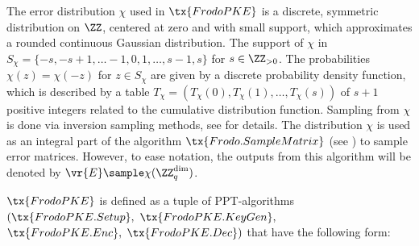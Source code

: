 \documentclass{fundam}
\begin{document}
The error distribution $\chi$ used in $\tx{FrodoPKE}$ is a discrete, symmetric distribution on $\ZZ$, centered at zero and with small support, which approximates a rounded continuous Gaussian distribution. The support of $\chi$ in $S_{\chi}=\{ -s, -s+1, \ldots -1, 0, 1, \ldots , s-1, s \}$ for $s\in\ZZ_{>0}$. The probabilities $\chi(z) = \chi(-z)$ for $z\in S_{\chi}$ are given by a discrete probability density function, which is described by a table $T_{\chi} = (T_{\chi}(0), T_{\chi}(1), \ldots , T_{\chi}(s))$ of $s+1$ positive integers related to the cumulative distribution function. Sampling from $\chi$ is done via inversion sampling methods, see \cite{Frodo,Frodo2} for details.
The distribution $\chi$ is used as an integral part of the algorithm $\tx{Frodo.SampleMatrix}$ (see \cite{Frodo,Frodo2}) to sample error matrices. However, to ease notation, the outputs from this algorithm will be denoted by $\vr{E}\sample \chi(\ZZ_{q}^{\dim})$. 

$\tx{FrodoPKE}$ is defined as a tuple of PPT-algorithms $(\tx{FrodoPKE.Setup},$ $\tx{FrodoPKE.KeyGen},$\\ $\tx{FrodoPKE.Enc},$ $\tx{FrodoPKE.Dec})$  that have the following form:
\end{document}
